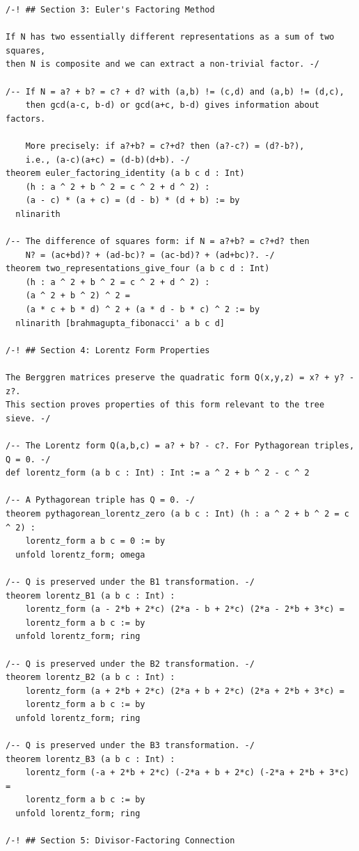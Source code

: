 \documentclass[11pt,twoside,openright]{book}
\theoremstyle{definition}
\theoremstyle{remark}
\begin{document}
\begin{lstlisting}[style=lean]
/-! ## Section 3: Euler's Factoring Method

If N has two essentially different representations as a sum of two squares,
then N is composite and we can extract a non-trivial factor. -/

/-- If N = a? + b? = c? + d? with (a,b) != (c,d) and (a,b) != (d,c),
    then gcd(a-c, b-d) or gcd(a+c, b-d) gives information about factors.
    
    More precisely: if a?+b? = c?+d? then (a?-c?) = (d?-b?),
    i.e., (a-c)(a+c) = (d-b)(d+b). -/
theorem euler_factoring_identity (a b c d : Int)
    (h : a ^ 2 + b ^ 2 = c ^ 2 + d ^ 2) :
    (a - c) * (a + c) = (d - b) * (d + b) := by
  nlinarith

/-- The difference of squares form: if N = a?+b? = c?+d? then
    N? = (ac+bd)? + (ad-bc)? = (ac-bd)? + (ad+bc)?. -/
theorem two_representations_give_four (a b c d : Int)
    (h : a ^ 2 + b ^ 2 = c ^ 2 + d ^ 2) :
    (a ^ 2 + b ^ 2) ^ 2 =
    (a * c + b * d) ^ 2 + (a * d - b * c) ^ 2 := by
  nlinarith [brahmagupta_fibonacci' a b c d]

/-! ## Section 4: Lorentz Form Properties

The Berggren matrices preserve the quadratic form Q(x,y,z) = x? + y? - z?.
This section proves properties of this form relevant to the tree sieve. -/

/-- The Lorentz form Q(a,b,c) = a? + b? - c?. For Pythagorean triples, Q = 0. -/
def lorentz_form (a b c : Int) : Int := a ^ 2 + b ^ 2 - c ^ 2

/-- A Pythagorean triple has Q = 0. -/
theorem pythagorean_lorentz_zero (a b c : Int) (h : a ^ 2 + b ^ 2 = c ^ 2) :
    lorentz_form a b c = 0 := by
  unfold lorentz_form; omega

/-- Q is preserved under the B1 transformation. -/
theorem lorentz_B1 (a b c : Int) :
    lorentz_form (a - 2*b + 2*c) (2*a - b + 2*c) (2*a - 2*b + 3*c) =
    lorentz_form a b c := by
  unfold lorentz_form; ring

/-- Q is preserved under the B2 transformation. -/
theorem lorentz_B2 (a b c : Int) :
    lorentz_form (a + 2*b + 2*c) (2*a + b + 2*c) (2*a + 2*b + 3*c) =
    lorentz_form a b c := by
  unfold lorentz_form; ring

/-- Q is preserved under the B3 transformation. -/
theorem lorentz_B3 (a b c : Int) :
    lorentz_form (-a + 2*b + 2*c) (-2*a + b + 2*c) (-2*a + 2*b + 3*c) =
    lorentz_form a b c := by
  unfold lorentz_form; ring

/-! ## Section 5: Divisor-Factoring Connection


\end{lstlisting}
\end{document}
